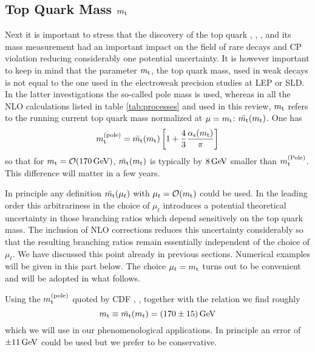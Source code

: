 \subsection{Top Quark Mass $m_{\rm t}$}
         \label{subsec:inputparams:mt}
Next it is important to stress that the discovery of the top quark
\cite{abeetal:94a}, \cite{abeetal:94b}, \cite{abeetal:95}, \cite{D0:95}
and its mass measurement had an important impact on the field of rare
decays and CP violation reducing considerably one potential
uncertainty. It is however important to keep in mind that the parameter
$m_{\rm t}$, the top quark mass, used in weak decays is not equal to the one
used in the electroweak precision studies at LEP or SLD. In the latter
investigations the so-called pole mass is used, whereas in all the NLO
calculations listed in table \ref{tab:processes} and used in this
review, $m_{\rm t}$ refers to the running current top quark mass normalized
at $\mu=m_{\rm t}$:  $\bar {m_{\rm t}}(m_{\rm t})$. One has
\begin{equation}
m_{\rm t}^{\rm (pole)}=\bar {m_{\rm t}}(m_{\rm t})
\left[ 1+\frac{4}{3}\frac{\alpha_{\rm s}(m_{\rm t})}{\pi}\right]
\label{eq:mtpolebar}
\end{equation}
so that for $m_{\rm t}={\cal O}(170\, {\rm GeV})$, $\bar {m_{\rm t}}(m_{\rm t})$ is typically by
$8\, {\rm GeV}$ smaller than $m_{\rm t}^{\rm (Pole)}$. This difference will matter in
a few years.

In principle any definition $\bar {m_{\rm t}}(\mu_t)$ with $\mu_t={\cal O}(m_{\rm t})$
could be used. In the leading order this arbitrariness in the choice of
$\mu_t$ introduces a potential theoretical uncertainty in those
branching ratios which depend sensitively on the top quark mass. The
inclusion of NLO corrections reduces this uncertainty considerably so
that the resulting branching ratios remain essentially independent of
the choice of $\mu_t$. We have discussed this point already in previous
sections. Numerical examples will be given in this part below.  The
choice $\mu_t=m_{\rm t}$ turns out to be convenient and will be adopted in
what follows.

Using the $m_{\rm t}^{\rm (pole)}$ quoted by CDF \cite{abeetal:94a},
\cite{abeetal:94b}, \cite{abeetal:95} together with the relation
 we find roughly
\begin{equation}
m_{\rm t}\equiv\bar {m_{\rm t}}(m_{\rm t})=(170\pm15)\, {\rm GeV}
\end{equation}
which we will use in our phenomenological applications. In principle an
error of $\pm 11\, {\rm GeV}$ could be used but we prefer to be
conservative.
